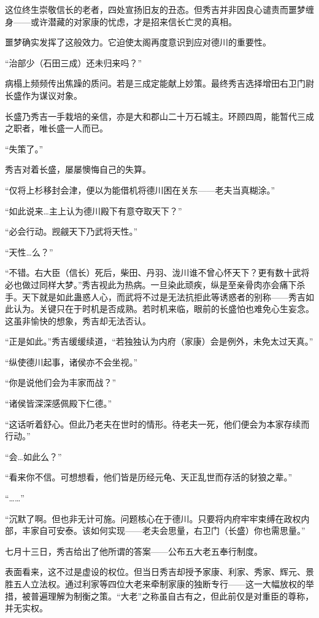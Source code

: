 \documentclass[
]{article}
\begin{document}
这位终生崇敬信长的老者，四处宣扬旧友的丑态。但秀吉并非因良心谴责而噩梦缠身------或许潜藏的对家康的忧虑，才是招来信长亡灵的真相。

噩梦确实发挥了这般效力。它迫使太阁再度意识到应对德川的重要性。

``治部少（石田三成）还未归来吗？''

病榻上频频传出焦躁的质问。若是三成定能献上妙策。最终秀吉选择增田右卫门尉长盛作为谋议对象。

长盛乃秀吉一手栽培的亲信，亦是大和郡山二十万石城主。环顾四周，能暂代三成之职者，唯长盛一人而已。

``失策了。''

秀吉对着长盛，屡屡懊悔自己的失算。

``仅将上杉移封会津，便以为能借机将德川困在关东------老夫当真糊涂。''

``如此说来\ldots 主上认为德川殿下有意夺取天下？''

``必会行动。觊觎天下乃武将天性。''

``天性\ldots 么？''

``不错。右大臣（信长）死后，柴田、丹羽、泷川谁不曾心怀天下？更有数十武将必也做过同样大梦。''秀吉视此为热病。一旦染此顽疾，纵是至亲骨肉亦会痛下杀手。天下就是如此蛊惑人心，而武将不过是无法抗拒此等诱惑者的别称------秀吉如此认为。关键只在于时机是否成熟。若时机来临，眼前的长盛怕也难免心生妄念。这虽非愉快的想象，秀吉却无法否认。

``正是如此。''秀吉缓缓续道，``若独独认为内府（家康）会是例外，未免太过天真。''

``纵使德川起事，诸侯亦不会坐视。''

``你是说他们会为丰家而战？''

``诸侯皆深深感佩殿下仁德。''

``这话听着舒心。但此乃老夫在世时的情形。待老夫一死，他们便会为本家存续而行动。''

``会\ldots 如此么？''

``看来你不信。可想想看，他们皆是历经元龟、天正乱世而存活的豺狼之辈。''

``\ldots\ldots{}''

``沉默了啊。但也非无计可施。问题核心在于德川。只要将内府牢牢束缚在政权内部，丰家自可安泰。该如何实现------老夫会思量，右卫门（长盛）你也需思量。''

七月十三日，秀吉给出了他所谓的答案------公布五大老五奉行制度。

表面看来，这不过是虚设的权位。但当日秀吉却授予家康、利家、秀家、辉元、景胜五人立法权。通过利家等四位大老来牵制家康的独断专行------这一大幅放权的举措，被普遍理解为制衡之策。``大老''之称虽自古有之，但此前仅是对重臣的尊称，并无实权。
\end{document}
